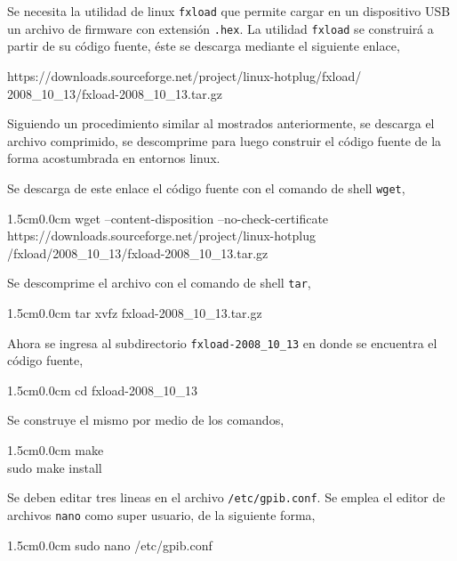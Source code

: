 \documentclass[paper=letter,oneside,fontsize=11pt, parskip=full]{scrartcl}
\newenvironment{code}
	{\begin{adjustwidth}{1.5cm}{0.0cm}\ttfamily}
	{\end{adjustwidth}}
\newenvironment{link}
	{\ttfamily}{}
\begin{document}
		Se necesita la utilidad de linux \texttt{fxload} que permite cargar en un dispositivo USB un archivo de firmware con extensión \texttt{.hex}. La utilidad \texttt{fxload} se construirá a partir de su código fuente, éste se descarga mediante el siguiente enlace,
		
		\begin{link}		
			https://downloads.sourceforge.net/project/linux-hotplug/fxload/ \\ 2008\_10\_13/fxload-2008\_10\_13.tar.gz		
		\end{link}
		
 		Siguiendo un procedimiento similar al mostrados anteriormente, se descarga el archivo comprimido, se descomprime para luego construir el código fuente de la forma acostumbrada en entornos linux. 
		
		Se descarga de este enlace el código fuente con el comando de shell \texttt{wget},
		
		\begin{code}			
			wget --content-disposition --no-check-certificate \\ https://downloads.sourceforge.net/project/linux-hotplug \\ /fxload/2008\_10\_13/fxload-2008\_10\_13.tar.gz
		\end{code}
		
		Se descomprime el archivo con el comando de shell \texttt{tar},

		\begin{code}				
			tar xvfz fxload-2008\_10\_13.tar.gz
		\end{code}
	
		Ahora se ingresa al subdirectorio \texttt{fxload-2008\_10\_13} en donde se encuentra el código fuente,

		\begin{code}			
			cd fxload-2008\_10\_13
		\end{code}
		
		Se construye el mismo por medio de los comandos,
		
		\begin{code}	
			make	\\		
			sudo make install
		\end{code}
		
		Se deben editar tres lineas en el archivo \texttt{/etc/gpib.conf}. Se emplea el editor de archivos \texttt{nano} como super usuario, de la siguiente forma, 
		
		\begin{code}			
			sudo nano /etc/gpib.conf
		\end{code}
		
\end{document}
